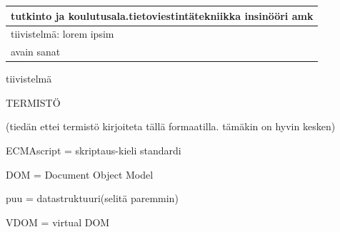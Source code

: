 \documentclass[11pt,a4paper,titlepage,oneside]{article}
\begin{document}
\begin{tabular}{ | l | }
    \begin{minipage}[t][1.5cm][t]{10cm}
    tutkinto ja koulutusala.\newline  tietoviestintätekniikka insinööri amk  

    \end{minipage}\\ \hline

    \begin{minipage}[t][7cm][t]{5cm}
    tiivistelmä: \newline lorem ipsim
    \end{minipage}\\ \hline

    \begin{minipage}[t][2cm][t]{5cm}
    avain sanat
    \end{minipage}\\ \hline

\end{tabular}

\newpage




tiivistelmä








\newpage



\setcounter{page}{0}
\pagestyle{empty}

\tableofcontents





\newpage





TERMISTÖ
\bigskip

(tiedän ettei termistö kirjoiteta tällä formaatilla. tämäkin on hyvin kesken)
\bigskip
 
ECMAscript = skriptaus-kieli standardi 
\bigskip

DOM = Document Object Model 
\bigskip

puu = datastruktuuri(selitä paremmin)
\bigskip

VDOM = virtual DOM
\bigskip
\end{document}
